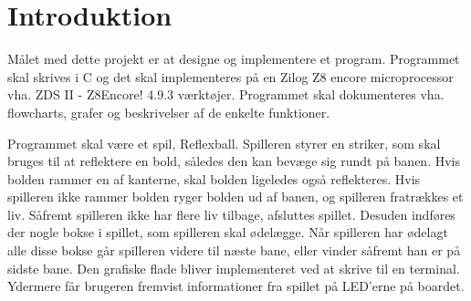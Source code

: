 \section{Introduktion}
Målet med dette projekt er at designe og implementere et program. Programmet skal skrives i C og det skal implementeres på en Zilog Z8 encore microprocessor vha. ZDS II - Z8Encore! 4.9.3 værktøjer. Programmet skal dokumenteres vha. flowcharts, grafer og beskrivelser af de enkelte funktioner.


Programmet skal være et spil, Reflexball. Spilleren styrer en striker, som skal bruges til at reflektere en bold, således den kan bevæge sig rundt på banen. Hvis bolden rammer en af kanterne, skal bolden ligeledes også reflekteres. Hvis spilleren ikke rammer bolden ryger bolden ud af banen, og spilleren fratrækkes et liv. Såfremt spilleren ikke har flere liv tilbage, afsluttes spillet. Desuden indføres der nogle bokse i spillet, som spilleren skal ødelægge. Når spilleren har ødelagt alle disse bokse går spilleren videre til næste bane, eller vinder såfremt han er på sidste bane. Den grafiske flade bliver implementeret ved at skrive til en terminal. Ydermere får brugeren fremvist informationer fra spillet på LED'erne på boardet.





 